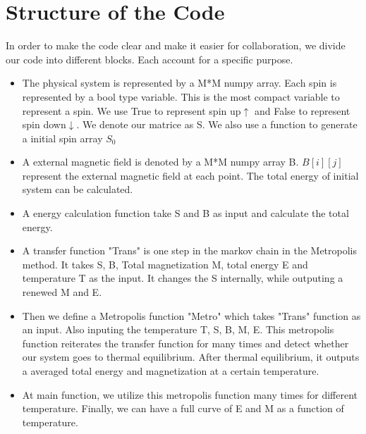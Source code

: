 \documentclass[letterpaper,12pt]{article}
\begin{document}
\section{Structure of the Code}

In order to make the code clear and make it easier for collaboration, we divide our code into different blocks. Each account for a specific purpose.

\begin{itemize}
    \item The physical system is represented by a M*M numpy array. Each spin is represented by a bool type variable. This is the most compact variable to represent a spin. We use True to represent spin up$\uparrow$ and False to represent spin down$\downarrow$. We denote our matrice as S. We also use a function to generate a initial spin array $S_0$
    \item A external magnetic field is denoted by a M*M numpy array B. $B[i][j]$ represent the external magnetic field at each point. The total energy of initial system can be calculated.
    \item A energy calculation function take S and B as input and calculate the total energy.
    \item A transfer function "Trans" is one step in the markov chain in the Metropolis method. It takes S, B, Total magnetization M, total energy E and temperature T as the input. It changes the S internally, while outputing a renewed M and E.
    \item Then we define a Metropolis function "Metro" which takes "Trans" function as an input. Also inputing the temperature T, S, B, M, E. This metropolis function reiterates the transfer function for many times and detect whether our system goes to thermal equilibrium. After thermal equilibrium, it outputs a averaged total energy and magnetization at a certain temperature.
    \item At main function, we utilize this metropolis function many times for different temperature. Finally, we can have a full curve of E and M as a function of temperature.
\end{itemize}



\end{document}
